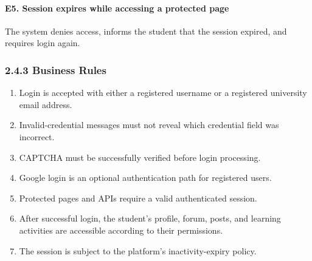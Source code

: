 \documentclass[12pt]{article}
\begin{document}
\paragraph*{E5. Session expires while accessing a protected page}
\par\medskip
The system denies access, informs the student that the session expired, and requires login again.
\par\medskip
\hypertarget{sec:2-4-3-business-rules}{}
\subsubsection*{2.4.3 Business Rules}
\par\medskip
\begin{enumerate}
\item Login is accepted with either a registered username or a registered university email address.
\item Invalid-credential messages must not reveal which credential field was incorrect.
\item CAPTCHA must be successfully verified before login processing.
\item Google login is an optional authentication path for registered users.
\item Protected pages and APIs require a valid authenticated session.
\item After successful login, the student's profile, forum, posts, and learning activities are accessible according to their permissions.
\item The session is subject to the platform's inactivity-expiry policy.
\end{enumerate}
\par\medskip
\hypertarget{sec:2-5-special-requirements}{}
\end{document}
